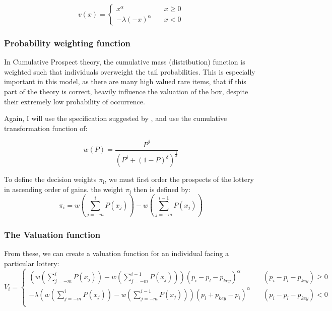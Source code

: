 \documentclass[11pt]{article}
\begin{document}
\begin{equation}
\label{piecewiseValuation}
v(x) = \begin{cases} x^\alpha \quad &x \geq 0\\ -\lambda(-x)^\alpha \quad &x < 0 \end{cases}
\end{equation}

\subsubsection{Probability weighting function}
\label{sec-2-3-2}

In Cumulative Prospect theory, the cumulative mass (distribution)
function is weighted such that individuals overweight the tail
probabilities. This is especially important in this model, as there are
many high valued rare items, that if this part of the theory is
correct, heavily influence the valuation of the box, despite their
extremely low probability of occurrence.

Again, I will use the specification suggested by \cite{Kahn}, and use
the cumulative transformation function of: 

\begin{equation}
\label{weightFunction}
w(P) = \frac{ P^\delta }{( P^\delta + (1-P)^\delta )^{\frac{1}{\delta}}}
\end{equation}

To define the decision weights $\pi$$_{\text{i}}$, we must first order the prospects
of the lottery in ascending order of gains. the weight $\pi$$_{\text{i}}$ then is
defined by: 
\begin{equation}
\label{piWeights}
\pi_i = w( \sum_{j = -m}^i P(x_j)) - w( \sum_{j=-m}^{i-1} P(x_j) )
\end{equation}

\subsubsection{The Valuation function}
\label{sec-2-3-3}

From these, we can create a valuation function for an individual
facing a particular lottery: 
\begin{equation}
\label{Valuation}
V_i = \begin{cases}
(w( \sum_{j = -m}^i P(x_j)) - w( \sum_{j=-m}^{i-1} P(x_j) ))(p_i - p_l - p_{key})^\alpha \quad &(p_i - p_l - p_{key}) \geq 0 \\
-\lambda(w( \sum_{j = -m}^i P(x_j)) - w( \sum_{j=-m}^{i-1} P(x_j) ))(p_l + p_{key} - p_i)^\alpha \quad &(p_i - p_l - p_{key}) < 0 \\
\end{cases}
\end{equation}
\end{document}
